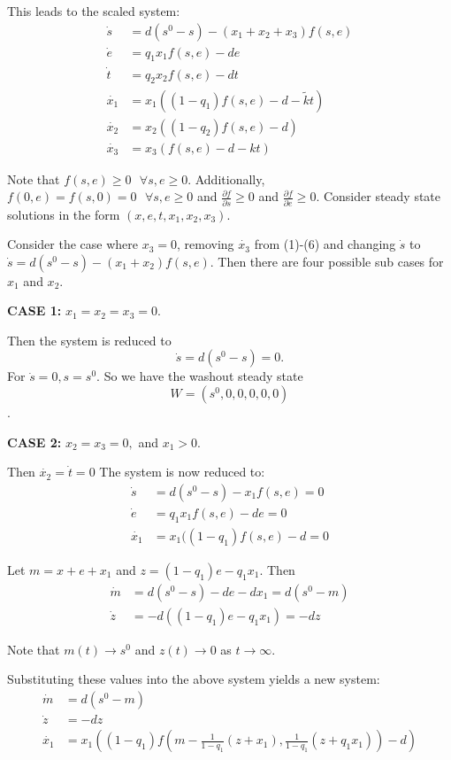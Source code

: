 \documentclass[12pt]{article}
\begin{document}
\noindent This leads to the scaled system: 
\begin{align}
\dot{s}&=d(s^0-s)-(x_1 + x_2+x_3) f(s,e)\\
\dot{e}&=q_1 x_1 f(s,e)-de\\
\dot{t}&=q_2 x_2 f(s,e) - dt\\
\dot{x_1} &= x_1((1-q_1)f(s,e)-d- \tilde{k}t)\\
\dot{x_2}&=x_2((1-q_2)f(s,e)-d)\\
\dot{x_3}&=x_3(f(s,e)-d-kt)
\end{align}

\noindent Note that $f(s,e) \geq 0 \text{ } \forall s,e\geq 0.$ Additionally, $f(0,e)=f(s,0)=0 \text{ }\forall s, e\geq 0$ and $\frac{\partial f}{\partial s} \geq 0$ and $\frac{\partial f}{\partial e} \geq 0$. Consider steady state solutions in the form $(x,e,t,x_1,x_2,x_3)$. 


\bigskip

\noindent Consider the case where $x_3=0$, removing $\dot{x_3}$ from (1)-(6) and changing $\dot{s}$ to $\dot{s}=d(s^0 -s) - (x_1+x_2)f(s,e)$. Then there are four possible sub cases for $x_1$ and $x_2$. 

\noindent \textbf{CASE 1:} $x_1=x_2=x_3=0$. 

\noindent Then the system is reduced to $$\dot{s}=d(s^0-s)=0.$$ For $\dot{s}=0, s=s^0$. So we have the washout steady state $$W=(s^0,0,0,0,0,0)$$.

\noindent \textbf{CASE 2: } $x_2=x_3=0,$ and $x_1>0$. 

\noindent Then $\dot{x_2} = \dot{t} =0$ The system is now reduced to: 
\begin{align}
\dot{s}&=d(s^0-s)-x_1 f(s,e) =0\\
\dot{e}&=q_1 x_1 f(s,e) - de = 0\\
\dot{x_1}&=x_1((1-q_1)f(s,e)-d=0
\end{align}

\noindent Let $m=x+e+x_1$ and $z=(1-q_1)e-q_1 x_1$. Then
\begin{align*}
\dot{m}&=d(s^0 -s) - de - dx_1 = d(s^0-m)\\
\dot{z}&=-d((1-q_1)e-q_1 x_1) = -dz
\end{align*}

\noindent Note that $m(t) \rightarrow s^0$ and $z(t) \rightarrow 0$ as $t \rightarrow \infty$. 

\noindent Substituting these values into the above system yields a new system: 
\begin{align}
\dot{m}&=d(s^0-m)\\
\dot{z}&=-dz\\
\dot{x_1}&=x_1((1-q_1)f(m-\frac{1}{1-q_1} (z+x_1),\frac{1}{1-q_1}(z+q_1 x_1))-d)
\end{align}
\end{document}

